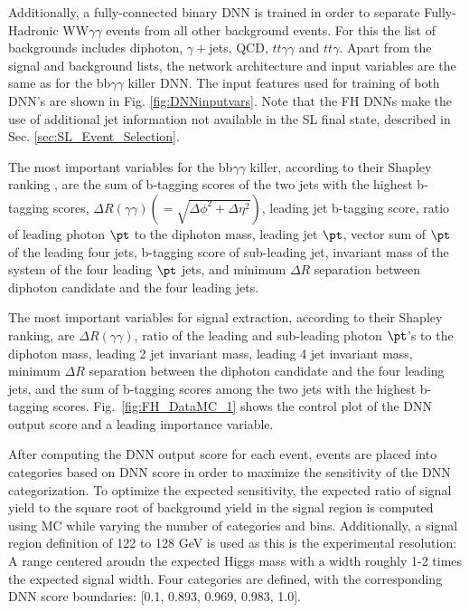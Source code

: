 Additionally, a fully-connected binary DNN is trained in order to separate Fully-Hadronic WW$\gamma\gamma$ events from all other background events.
For this the list of backgrounds includes diphoton, $\gamma+$jets, QCD, $tt\gamma\gamma$ and $tt\gamma$.
Apart from the signal and background lists, the network architecture and input variables are the same as for the bb$\gamma\gamma$ killer DNN. The input features 
used for training of both DNN's are shown in Fig. \ref{fig:DNNinputvars}. Note that the FH DNNs make the use of additional jet information not available in the SL final state, described in Sec. \ref{sec:SL_Event_Selection}. 

The most important variables for the bb$\gamma\gamma$ killer, according to their Shapley ranking \cite{shapley_values}, are
the sum of b-tagging scores of the two jets with the highest b-tagging scores, $\Delta R (\gamma\gamma) (=\sqrt{\Delta \phi^2 + \Delta \eta^2})$,
leading jet b-tagging score, ratio of leading photon $\pt$ to the diphoton mass, leading jet $\pt$,  vector sum of $\pt$ of the leading four jets,
b-tagging score of sub-leading jet, invariant mass of the system of the four leading $\pt$ jets, and minimum $\Delta R$ separation between
diphoton candidate and the four leading jets.

The most important variables for signal extraction, according to their Shapley ranking, are $\Delta R (\gamma\gamma)$, 
ratio of the leading and sub-leading photon $\pt$'s to the diphoton mass,
leading 2 jet invariant mass, leading 4 jet invariant mass, minimum $\Delta R$ separation between
the diphoton candidate and the four leading jets, and the sum of b-tagging scores among the two jets with the highest
b-tagging scores. Fig.~\ref{fig:FH_DataMC_1} shows the control plot of the DNN output score and a leading importance variable. 

After computing the DNN output score for each event, events are placed into categories based on DNN score in order to maximize the sensitivity of the DNN categorization. 
To optimize the expected sensitivity, the expected ratio of signal yield to the square root of background yield in the signal region is computed using MC while varying the number of categories and bins. 
Additionally, a signal region definition of 122 to 128 GeV is used as this is the experimental resolution: A range centered aroudn the expected Higgs mass with a width roughly 1-2 times 
the expected signal width. Four categories are defined, with the corresponding DNN score boundaries: [0.1, 0.893, 0.969, 0.983, 1.0].


